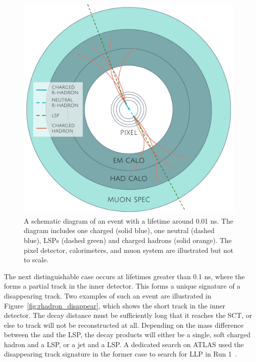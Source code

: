 \begin{figure}[h!]
\centering
\includegraphics[width=\halffig]{figures/rhadron_displaced.pdf}
\caption{A schematic diagram of an \rhadron event with a lifetime around 0.01 ns. The diagram includes one charged \rhadron (solid blue), one neutral \rhadron (dashed blue), \acp{LSP} (dashed green) and charged hadrons (solid orange). The pixel detector, calorimeters, and muon system are illustrated but not to scale.}\label{fig:rhadron_displaced}
\label{fig:rhadron_displaced}
\end{figure}

The next distinguishable case occurs at lifetimes greater than 0.1 ns, where the \rhadron forms a partial track in the inner detector.
This forms a unique signature of a disappearing track.
Two examples of such an event are illustrated in Figure~\ref{fig:rhadron_disappear}, which shows the short track in the inner detector. 
The decay distance must be sufficiently long that it reaches the \ac{SCT}, or else to track will not be reconstructed at all.
Depending on the mass difference between the \rhadron and the \ac{LSP}, the decay products will either be a single, soft charged hadron and a \ac{LSP}, or a jet and a \ac{LSP}.
A dedicated search on ATLAS used the disappearing track signature  in the former case to search for \ac{LLP} in Run 1~\cite{SUSY-2013-01}.

